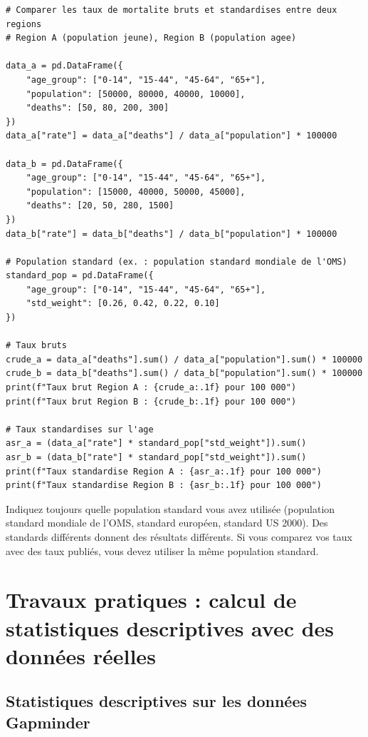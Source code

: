 \begin{verbatim}
# Comparer les taux de mortalite bruts et standardises entre deux regions
# Region A (population jeune), Region B (population agee)

data_a = pd.DataFrame({
    "age_group": ["0-14", "15-44", "45-64", "65+"],
    "population": [50000, 80000, 40000, 10000],
    "deaths": [50, 80, 200, 300]
})
data_a["rate"] = data_a["deaths"] / data_a["population"] * 100000

data_b = pd.DataFrame({
    "age_group": ["0-14", "15-44", "45-64", "65+"],
    "population": [15000, 40000, 50000, 45000],
    "deaths": [20, 50, 280, 1500]
})
data_b["rate"] = data_b["deaths"] / data_b["population"] * 100000

# Population standard (ex. : population standard mondiale de l'OMS)
standard_pop = pd.DataFrame({
    "age_group": ["0-14", "15-44", "45-64", "65+"],
    "std_weight": [0.26, 0.42, 0.22, 0.10]
})

# Taux bruts
crude_a = data_a["deaths"].sum() / data_a["population"].sum() * 100000
crude_b = data_b["deaths"].sum() / data_b["population"].sum() * 100000
print(f"Taux brut Region A : {crude_a:.1f} pour 100 000")
print(f"Taux brut Region B : {crude_b:.1f} pour 100 000")

# Taux standardises sur l'age
asr_a = (data_a["rate"] * standard_pop["std_weight"]).sum()
asr_b = (data_b["rate"] * standard_pop["std_weight"]).sum()
print(f"Taux standardise Region A : {asr_a:.1f} pour 100 000")
print(f"Taux standardise Region B : {asr_b:.1f} pour 100 000")
\end{verbatim}

\begin{warningbox}
Indiquez toujours quelle population standard vous avez utilis\'ee (population standard mondiale de l'OMS, standard europ\'een, standard US 2000). Des standards diff\'erents donnent des r\'esultats diff\'erents. Si vous comparez vos taux avec des taux publi\'es, vous devez utiliser la m\^eme population standard.
\end{warningbox}

\section{Travaux pratiques : calcul de statistiques descriptives avec des donn\'ees r\'eelles}

\subsection{Statistiques descriptives sur les donn\'ees Gapminder}

